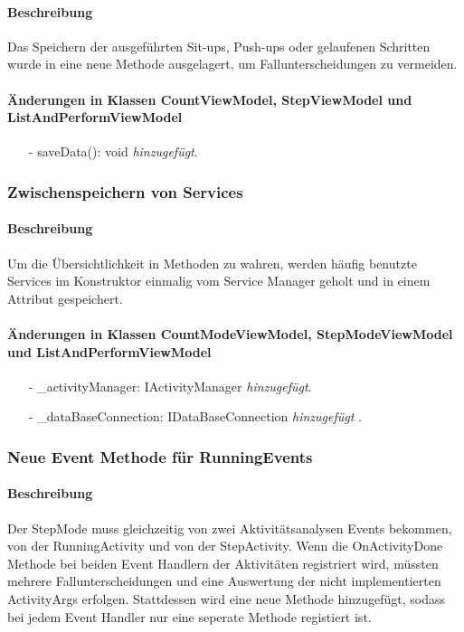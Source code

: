 \documentclass[a4paper,12pt]{article}
\begin{document}
\paragraph{Beschreibung}
Das Speichern der ausgeführten Sit-ups, Push-ups oder gelaufenen Schritten wurde in eine neue Methode ausgelagert, um Fallunterscheidungen zu vermeiden.
\paragraph{Änderungen in Klassen CountViewModel, StepViewModel und ListAndPerformViewModel} 
\begin{itemize}
	\item[-] saveData(): void \textit{hinzugefügt}.
\end{itemize}

\subsubsection{Zwischenspeichern von Services}
\paragraph{Beschreibung}
Um die Übersichtlichkeit in Methoden zu wahren, werden häufig benutzte Services im Konstruktor einmalig vom Service Manager geholt und in einem Attribut gespeichert.
\paragraph{Änderungen in Klassen CountModeViewModel, StepModeViewModel und ListAndPerformViewModel} 
\begin{itemize}
	\item[-] \_activityManager: IActivityManager \textit{hinzugefügt}.
	\item[-] \_dataBaseConnection: IDataBaseConnection \textit{hinzugefügt} .
\end{itemize}

\subsubsection{Neue Event Methode für RunningEvents}
\paragraph{Beschreibung}
Der StepMode muss gleichzeitig von zwei Aktivitätsanalysen Events bekommen, von der RunningActivity und von der StepActivity. Wenn die OnActivityDone Methode bei beiden Event Handlern der Aktivitäten registriert wird, müssten mehrere Fallunterscheidungen und eine Auswertung der nicht implementierten ActivityArgs erfolgen. Stattdessen wird eine neue Methode hinzugefügt, sodass bei jedem Event Handler nur eine seperate Methode registiert ist.
\end{document}
